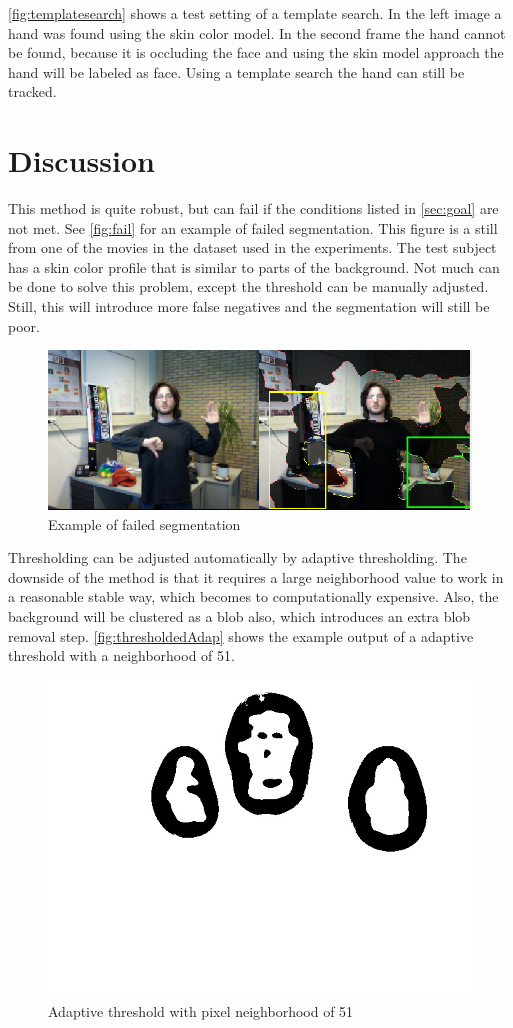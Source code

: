 \autoref{fig:templatesearch} shows a test setting of a template search. In the left image a hand was found using the skin color model. In the second frame the hand cannot be found, because it is occluding the face and using the skin model approach the hand will be labeled as face. Using a template search the hand can still be tracked.


\section{Discussion}
This method is quite robust, but can fail if the conditions listed in \autoref{sec:goal} are not met. See \autoref{fig:fail} for an example of failed segmentation. This figure is a still from one of the movies in the dataset used in the experiments. The test subject has a skin color profile that is similar to parts of the background. Not much can be done to solve this problem, except the threshold can be manually adjusted. Still, this will introduce more false negatives and the segmentation will still be poor.

\begin{figure}[htbp]
\center{}
\includegraphics[width=0.8\linewidth]{figures/fail.png}
\caption{Example of failed segmentation}
\label{fig:fail}
\end{figure}

Thresholding can be adjusted automatically by adaptive thresholding. The downside of the method is that it requires a large neighborhood value to work in a reasonable stable way, which becomes to computationally expensive. Also, the background will be clustered as a blob also, which introduces an extra blob removal step. \autoref{fig:thresholdedAdap} shows the example output of a adaptive threshold with a neighborhood of 51.


\begin{figure}[htbp]
\center{}
\includegraphics[width=0.3\linewidth]{figures/pipeline/thresholdedAdap.jpg}
\caption{Adaptive threshold with pixel neighborhood of 51}
\label{fig:thresholdedAdap}
\end{figure}






